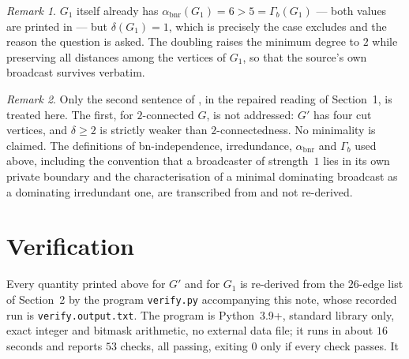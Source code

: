 \documentclass[11pt]{amsart}
\theoremstyle{remark}
\newtheorem*{remark}{Remark}
\DeclareMathOperator{\bnr}{bnr}
\newcommand{\abnr}{\alpha_{\bnr}}
\newcommand{\Gb}{\Gamma_{b}}
\newcommand{\Gp}{G'}
\begin{document}
\begin{remark}
$G_1$ itself already has $\abnr(G_1)=6>5=\Gb(G_1)$ --- both values are printed
in \cite{MN24} --- but $\delta(G_1)=1$, which is precisely the case
\cite{MN24} excludes and the reason the question is asked. The doubling
raises the minimum degree to $2$ while preserving all distances among the
vertices of $G_1$, so that the source's own broadcast survives verbatim.
\end{remark}

\begin{remark}
Only the second sentence of \cite[Question~4]{MN24}, in the repaired reading of
Section~1, is treated here. The first, for $2$-connected $G$, is not addressed:
$\Gp$ has four cut vertices, and $\delta\ge2$ is strictly weaker than
$2$-connectedness. No minimality is
claimed. The definitions of
bn-independence, irredundance, $\abnr$ and $\Gb$ used above, including the
convention that a broadcaster of strength~$1$ lies in its own private boundary
and the characterisation of a minimal dominating broadcast as a dominating
irredundant one, are transcribed from \cite{MN24,Erwin} and not re-derived.
\end{remark}

\section{Verification}\label{sec:ver}

Every quantity printed above for $\Gp$ and for $G_1$ is re-derived from the
$26$-edge list of Section~2 by the program
\texttt{verify.py} accompanying this note, whose recorded run is
\texttt{verify.output.txt}. The program is Python~3.9+, standard library only, exact
integer and bitmask arithmetic, no external data file; it runs in about $16$
seconds and reports $53$ checks, all passing, exiting $0$ only if every check
passes. It
\end{document}
